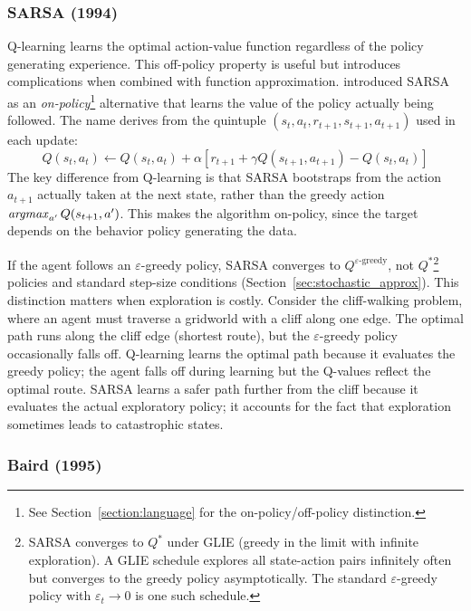 \subsubsection{SARSA (1994)}

Q-learning learns the optimal action-value function regardless of the policy generating experience. This off-policy property is useful but introduces complications when combined with function approximation. \citet{rummery1994} introduced SARSA as an \textit{on-policy}\footnote{See Section~\ref{section:language} for the on-policy/off-policy distinction.} alternative that learns the value of the policy actually being followed. The name derives from the quintuple $(s_t, a_t, r_{t+1}, s_{t+1}, a_{t+1})$ used in each update:
\begin{equation}
Q(s_t, a_t) \leftarrow Q(s_t, a_t) + \alpha \left[ r_{t+1} + \gamma Q(s_{t+1}, a_{t+1}) - Q(s_t, a_t) \right]
\end{equation}
The key difference from Q-learning is that SARSA bootstraps from the action $a_{t+1}$ actually taken at the next state, rather than the greedy action $\mathop{\it argmax}_{a'} Q(s_{t+1}, a')$. This makes the algorithm on-policy, since the target depends on the behavior policy generating the data.

If the agent follows an $\varepsilon$-greedy policy, SARSA converges to $Q^{\varepsilon\text{-greedy}}$, not $Q^*$\footnote{SARSA converges to $Q^*$ under GLIE (greedy in the limit with infinite exploration). A GLIE schedule explores all state-action pairs infinitely often but converges to the greedy policy asymptotically. The standard $\varepsilon$-greedy policy with $\varepsilon_t \to 0$ is one such schedule.} policies and standard step-size conditions (Section~\ref{sec:stochastic_approx}). This distinction matters when exploration is costly. Consider the cliff-walking problem, where an agent must traverse a gridworld with a cliff along one edge. The optimal path runs along the cliff edge (shortest route), but the $\varepsilon$-greedy policy occasionally falls off. Q-learning learns the optimal path because it evaluates the greedy policy; the agent falls off during learning but the Q-values reflect the optimal route. SARSA learns a safer path further from the cliff because it evaluates the actual exploratory policy; it accounts for the fact that exploration sometimes leads to catastrophic states. 

\subsubsection{Baird (1995)}

